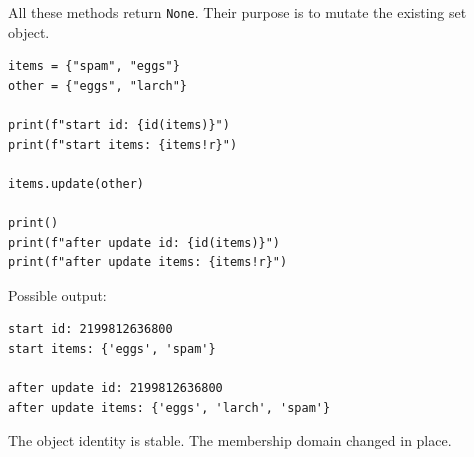All these methods return \texttt{None}. Their purpose is to mutate the existing set object.

\begin{verbatim}
items = {"spam", "eggs"}
other = {"eggs", "larch"}

print(f"start id: {id(items)}")
print(f"start items: {items!r}")

items.update(other)

print()
print(f"after update id: {id(items)}")
print(f"after update items: {items!r}")
\end{verbatim}

Possible output:

\begin{verbatim}
start id: 2199812636800
start items: {'eggs', 'spam'}

after update id: 2199812636800
after update items: {'eggs', 'larch', 'spam'}
\end{verbatim}

The object identity is stable. The membership domain changed in place.